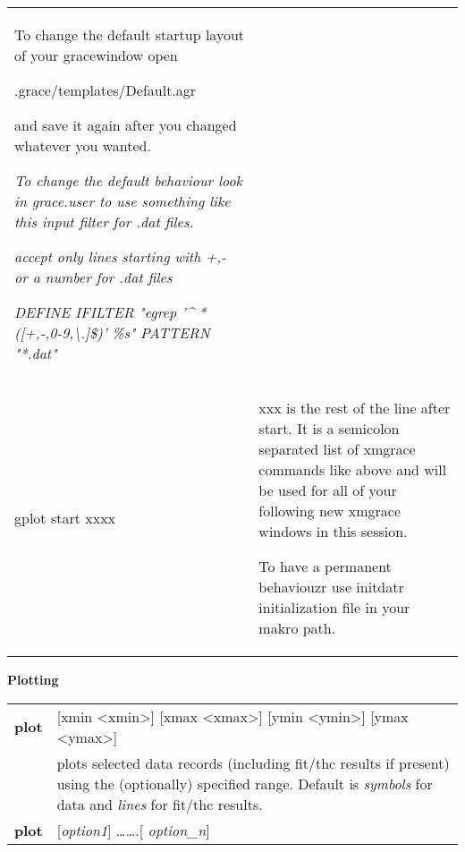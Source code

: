\documentclass[]{article}
\begin{document}
\begin{longtable}[]{@{}ll@{}}
\begin{minipage}[t]{0.47\columnwidth}
To change the default startup layout of your gracewindow open

.grace/templates/Default.agr

and save it again after you changed whatever you wanted.

\emph{To change the default behaviour look in grace.user to use
something like this input filter for .dat files. }

\emph{accept only lines starting with +,- or a number for .dat files}

\emph{DEFINE IFILTER "egrep '\^{}
*({[}+,-,0-9,\textbackslash{}.{]}\textbar{}\$)' \%s" PATTERN
"*.dat"}\strut
\end{minipage}\tabularnewline
\begin{minipage}[t]{0.47\columnwidth}\raggedright
gplot start xxxx\strut
\end{minipage} & \begin{minipage}[t]{0.47\columnwidth}\raggedright
xxx is the rest of the line after start. It is a semicolon separated
list of xmgrace commands like above and will be used for all of your
following new xmgrace windows in this session.

To have a permanent behaviouzr use initdatr initialization file in your
makro path.\strut
\end{minipage}\tabularnewline
\bottomrule
\end{longtable}

\textbf{Plotting }

\begin{longtable}[]{@{}ll@{}}
\toprule
\endhead
\textbf{plot} & {[}xmin \textless{}xmin\textgreater{}{]} {[}xmax
\textless{}xmax\textgreater{}{]} {[}ymin
\textless{}ymin\textgreater{}{]} {[}ymax
\textless{}ymax\textgreater{}{]}\tabularnewline
& plots selected data records (including fit/thc results if present)
using the (optionally) specified range. Default is \emph{symbols} for
data and \emph{lines} for fit/thc results.\tabularnewline
\textbf{plot} & {[}\emph{option1}{]} \ldots{}\ldots{}.{[}
\emph{option\_n}{]}\tabularnewline
\bottomrule
\end{longtable}
\end{document}
